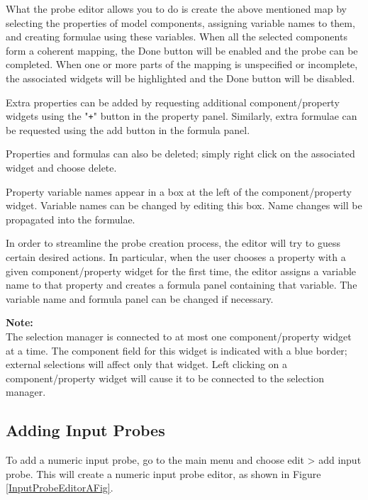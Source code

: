 \documentclass{article}
\begin{document}
What the probe editor allows you to do is create the above mentioned
map by selecting the properties of model components, assigning
variable names to them, and creating formulae using these
variables. When all the selected components form a coherent mapping,
the {\sf Done} button will be enabled and the probe can be completed. When
one or more parts of the mapping is unspecified or incomplete, the
associated widgets will be highlighted and the {\sf Done} button will be
disabled.

Extra properties can be added by requesting additional
component/property widgets using the "{\tt +}" button
in the property panel. Similarly,
extra formulae can be requested using
the add button in the formula panel.

Properties and formulas can also be deleted; simply right
click on the associated widget and choose {\sf delete}.

Property variable names appear in a box at the left of the
component/property widget. Variable names can be changed by editing
this box. Name changes will be propagated into the formulae.

In order to streamline the probe creation process, the editor will try
to guess certain desired actions.  In particular, when the user
chooses a property with a given component/property widget for the
first time, the editor assigns a variable name to that property and
creates a formula panel containing that variable. The variable name
and formula panel can be changed if necessary.

\begin{sideblock}
{\bf Note:}\\ 
The selection manager is connected to at most one
component/property widget at a time. The component field for this
widget is indicated with a blue border; external selections will
affect only that widget. Left clicking on a component/property widget
will cause it to be connected to the selection manager.
\end{sideblock}

\subsection{Adding Input Probes}

To add a numeric input probe, go to the main
menu and choose {\sf edit > add input probe}. This will create
a numeric input probe editor, as shown in Figure \ref{InputProbeEditorAFig}.
\end{document}
